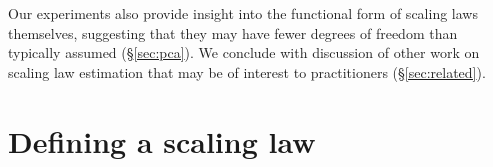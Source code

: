 \documentclass{article}
\theoremstyle{plain}
\theoremstyle{definition}
\theoremstyle{remark}
\begin{document}
Our experiments also provide insight into the functional form of scaling laws themselves, suggesting that they may have fewer degrees of freedom than typically assumed (\S\ref{sec:pca}).
We conclude with discussion of other work on scaling law estimation that may be of interest to practitioners (\S\ref{sec:related}).




\section{Defining a scaling law}\label{sec:definitions}
\end{document}
